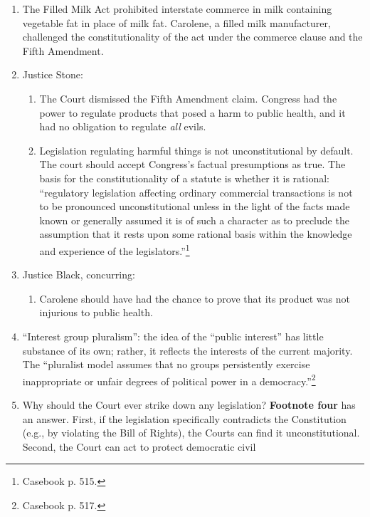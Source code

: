 \begin{enumerate}
    \item The Filled Milk Act prohibited interstate commerce in milk 
    containing vegetable fat in place of milk fat. Carolene, a filled milk 
    manufacturer, challenged the constitutionality of the act under the 
    commerce clause and the Fifth Amendment.
    \item Justice Stone:
    \begin{enumerate}
        \item The Court dismissed the Fifth Amendment claim. Congress had the 
        power to regulate products that posed a harm to public health, and it 
        had no obligation to regulate \emph{all} evils.
        \item Legislation regulating harmful things is not unconstitutional by 
        default. The court should accept Congress's factual presumptions 
        as true. The basis for the constitutionality of a statute is whether 
        it is rational: ``regulatory legislation affecting ordinary commercial 
        transactions is not to be pronounced unconstitutional unless in the 
        light of the facts made known or generally assumed it is of such a 
        character as to preclude the assumption that it rests upon some 
        rational basis within the knowledge and experience of the 
        legislators.''\footnote{Casebook p. 515.}
    \end{enumerate}
    \item Justice Black, concurring:
    \begin{enumerate}
        \item Carolene should have had the chance to prove that its product 
        was not injurious to public health. 
    \end{enumerate}
    \item ``Interest group pluralism'': the idea of the ``public interest'' 
    has little substance of its own; rather, it reflects the interests of the 
    current majority. The ``pluralist model assumes that no groups 
    persistently exercise inappropriate or unfair degrees of political power 
    in a democracy.''\footnote{Casebook p. 517.}
    \item Why should the Court ever strike down any legislation? \textbf{Footnote four} 
    has an answer. First, if the legislation specifically contradicts the 
    Constitution (e.g., by violating the Bill of Rights), the Courts can find 
    it unconstitutional. Second, the Court can act to protect democratic civil 

\end{enumerate}
